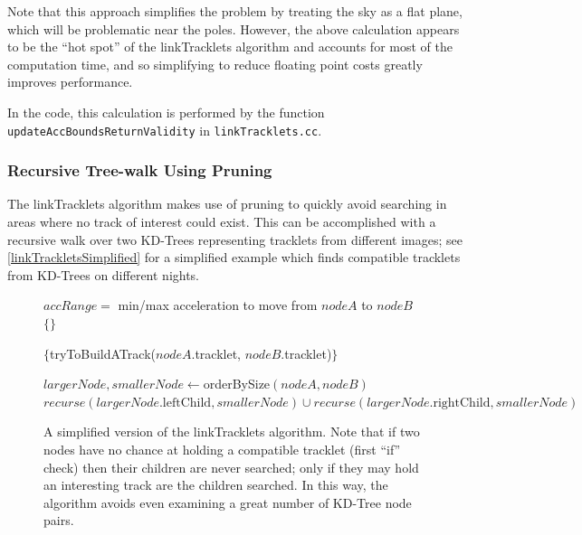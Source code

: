 Note that this approach simplifies the problem by treating the sky as
a flat plane, which will be problematic near the poles.  However, the
above calculation appears to be the ``hot spot'' of the linkTracklets
algorithm and accounts for most of the computation time, and so
simplifying to reduce floating point costs greatly improves
performance.

In the code, this calculation is performed by the function 
{\tt updateAccBoundsReturnValidity} in {\tt linkTracklets.cc}.

\subsubsection{Recursive Tree-walk Using Pruning}

The linkTracklets algorithm makes use of pruning to quickly avoid
searching in areas where no track of interest could exist.  This can
be accomplished with a recursive walk over two KD-Trees representing
tracklets from different images; see \ref{linkTrackletsSimplified}
for a simplified example which finds compatible tracklets from
KD-Trees on different nights.

\begin{figure}[ht!]
\begin{algorithmic}
  
  \STATE $accRange = $ min/max acceleration to move from $nodeA$ to $nodeB$
  \RETURN $\{\}$
  \ELSE
  
  \STATE {}
    
    \RETURN $\{$tryToBuildATrack($nodeA$.tracklet, $nodeB$.tracklet)$\}$
    \ELSE
    
    \STATE {}
    
    \STATE $largerNode, smallerNode \gets $orderBySize$(nodeA, nodeB)$
    \RETURN $recurse(largerNode.\text{leftChild}, smallerNode) \cup recurse(largerNode.\text{rightChild}, smallerNode)$
    \ENDIF
    \ENDIF
    
  \end{algorithmic}
  \caption{A simplified version of the linkTracklets algorithm.  Note
    that if two nodes have no chance at holding a compatible tracklet
    (first ``if'' check) then their children are never searched; only if
    they may hold an interesting track are the children searched.  In
    this way, the algorithm avoids even examining a great number of
    KD-Tree node pairs.}
  
  \label{simplifiedLinkTracklets}
\end{figure}


